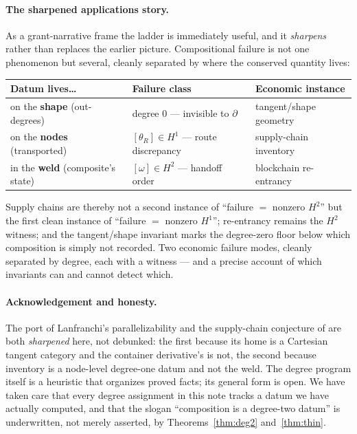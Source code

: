 \documentclass[11pt]{article}
\theoremstyle{definition}
\begin{document}
\paragraph{The sharpened applications story.}
As a grant-narrative frame the ladder is immediately useful, and it \emph{sharpens} rather than
replaces the earlier picture. Compositional failure is not one phenomenon but several, cleanly
separated by where the conserved quantity lives:
\begin{center}
\begin{tabular}{@{}lll@{}}
\toprule
Datum lives\ldots & Failure class & Economic instance \\
\midrule
on the \textbf{shape} (out-degrees) & degree $0$ --- invisible to $\partial$ & tangent/shape geometry \\
on the \textbf{nodes} (transported) & $[\theta_R]\in H^1$ --- route discrepancy & supply-chain inventory \\
in the \textbf{weld} (composite's state) & $[\omega]\in H^2$ --- handoff order & blockchain re-entrancy \\
\bottomrule
\end{tabular}
\end{center}
Supply chains are thereby not a second instance of ``failure $=$ nonzero $H^2$'' but the first clean
instance of ``failure $=$ nonzero $H^1$''; re-entrancy remains the $H^2$ witness; and the
tangent/shape invariant marks the degree-zero floor below which composition is simply not recorded.
Two economic failure modes, cleanly separated by degree, each with a witness --- and a precise
account of which invariants can and cannot detect which.

\paragraph{Acknowledgement and honesty.}
The port of Lanfranchi's parallelizability \cite{Lanfranchi2026} and the supply-chain conjecture of
\cite{MacBethSupplyChain} are both \emph{sharpened} here, not debunked: the first because its home
is a Cartesian tangent category and the container derivative's is not, the second because inventory
is a node-level degree-one datum and not the weld. The degree program itself is a heuristic that
organizes proved facts; its general form is open. We have taken care that every degree assignment in
this note tracks a datum we have actually computed, and that the slogan ``composition is a
degree-two datum'' is underwritten, not merely asserted, by Theorems~\ref{thm:deg2}
and~\ref{thm:thin}.
\end{document}
